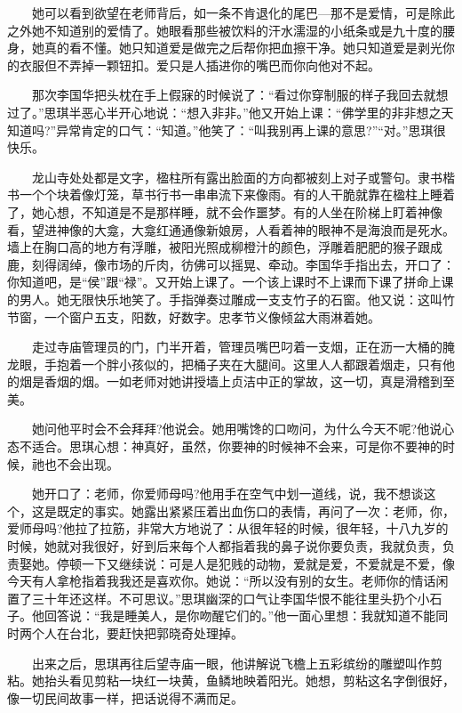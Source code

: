 \documentclass[12pt,UTF8]{ctexbook}
\begin{document}
　　她可以看到欲望在老师背后，如一条不肯退化的尾巴---那不是爱情，可是除此之外她不知道别的爱情了。她眼看那些被饮料的汗水濡湿的小纸条或是九十度的腰身，她真的看不懂。她只知道爱是做完之后帮你把血擦干净。她只知道爱是剥光你的衣服但不弄掉一颗钮扣。爱只是人插进你的嘴巴而你向他对不起。

　　那次李国华把头枕在手上假寐的时候说了：\enquote{看过你穿制服的样子我回去就想过了。}思琪半恶心半开心地说：\enquote{想入非非。}他又开始上课：\enquote{佛学里的非非想之天知道吗?}异常肯定的口气：\enquote{知道。}他笑了：\enquote{叫我别再上课的意思?}\enquote{对。}思琪很快乐。

　　龙山寺处处都是文字，楹柱所有露出脸面的方向都被刻上对子或警句。隶书楷书一个个块着像灯笼，草书行书一串串流下来像雨。有的人干脆就靠在楹柱上睡着了，她心想，不知道是不是那样睡，就不会作噩梦。有的人坐在阶梯上盯着神像看，望进神像的大龛，大龛红通通像新娘房，人看着神的眼神不是海浪而是死水。墙上在胸口高的地方有浮雕，被阳光照成柳橙汁的颜色，浮雕着肥肥的猴子跟成鹿，刻得阔绰，像市场的斤肉，彷佛可以摇晃、牵动。李国华手指出去，开口了：你知道吧，是\enquote{侯}跟\enquote{禄}。又开始上课了。一个该上课时不上课而下课了拼命上课的男人。她无限快乐地笑了。手指弹奏过雕成一支支竹子的石窗。他又说：这叫竹节窗，一个窗户五支，阳数，好数字。忠孝节义像倾盆大雨淋着她。

　　走过寺庙管理员的门，门半开着，管理员嘴巴叼着一支烟，正在沥一大桶的腌龙眼，手抱着一个胖小孩似的，把桶子夹在大腿间。这里人人都跟着烟走，只有他的烟是香烟的烟。一如老师对她讲授墙上贞洁中正的掌故，这一切，真是滑稽到至美。

　　她问他平时会不会拜拜?他说会。她用嘴馋的口吻问，为什么今天不呢?他说心态不适合。思琪心想：神真好，虽然，你要神的时候神不会来，可是你不要神的时候，祂也不会出现。

　　她开口了：老师，你爱师母吗?他用手在空气中划一道线，说，我不想谈这个，这是既定的事实。她露出紧紧压着出血伤口的表情，再问了一次：老师，你，爱师母吗?他拉了拉筋，非常大方地说了：从很年轻的时候，很年轻，十八九岁的时候，她就对我很好，好到后来每个人都指着我的鼻子说你要负责，我就负责，负责娶她。停顿一下又继续说：可是人是犯贱的动物，爱就是爱，不爱就是不爱，像今天有人拿枪指着我我还是喜欢你。她说：\enquote{所以没有别的女生。老师你的情话闲置了三十年还这样。不可思议。}思琪幽深的口气让李国华恨不能往里头扔个小石子。他回答说：\enquote{我是睡美人，是你吻醒它们的。}他一面心里想：我就知道不能同时两个人在台北，要赶快把郭晓奇处理掉。

　　出来之后，思琪再往后望寺庙一眼，他讲解说飞檐上五彩缤纷的雕塑叫作剪粘。她抬头看见剪粘一块红一块黄，鱼鳞地映着阳光。她想，剪粘这名字倒很好，像一切民间故事一样，把话说得不满而足。
\end{document}
